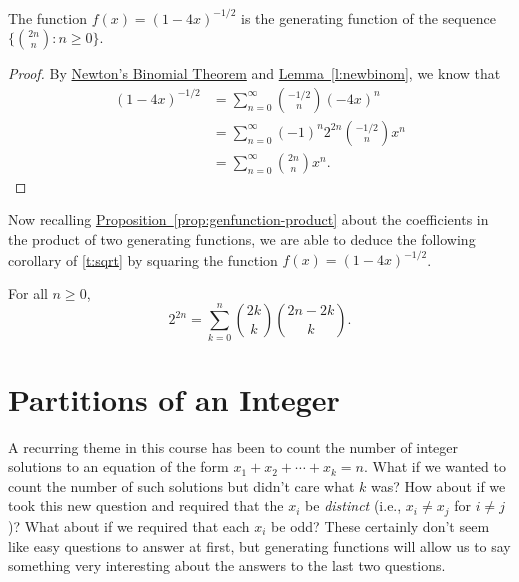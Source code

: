 \begin{theorem}\label{t:sqrt}
  The function $f(x)=(1-4x)^{-1/2}$ is the generating function of the
  sequence $\{\binom{2n}{n}:n\ge0\}$.
\end{theorem}

\begin{proof}
  By \hyperref[thm:newton-binomial]{Newton's Binomial Theorem} and
  \hyperref[l:newbinom]{Lemma~\ref*{l:newbinom}}, we know that
\begin{align*}
(1-4x)^{-1/2}&=\sum_{n=0}^\infty\binom{-1/2}{n}(-4x)^n\\
             &=\sum_{n=0}^\infty(-1)^n2^{2n}\binom{-1/2}{n}x^n\\
             &=\sum_{n=0}^\infty \binom{2n}{n}x^n.
\end{align*}
\end{proof}

Now recalling
\hyperref[prop:genfunction-product]{Proposition~\ref*{prop:genfunction-product}}
about the coefficients in the product of two generating functions, we
are able to deduce the following corollary of \autoref{t:sqrt} by
squaring the function $f(x) = (1-4x)^{-1/2}$.

\begin{corollary}
For all $n\ge0$,
\[
2^{2n}=\sum_{k=0}^n\binom{2k}{k}\binom{2n-2k}{k}.
\]
\end{corollary}



\section{Partitions of an Integer}\label{s:genfunction:partitions-integer}

A recurring theme in this course has been to count the number of
integer solutions to an equation of the form $x_1+x_2+\cdots + x_k = n$. What
if we wanted to count the number of such solutions but didn't care
what $k$ was? How about if we took this new question and required that
the $x_i$ be \emph{distinct} (i.e., $x_i\neq x_j$ for $i\neq j$)? What
about if we required that each $x_i$ be odd? These certainly don't
seem like easy questions to answer at first, but generating functions
will allow us to say something very interesting about the answers to
the last two questions.

